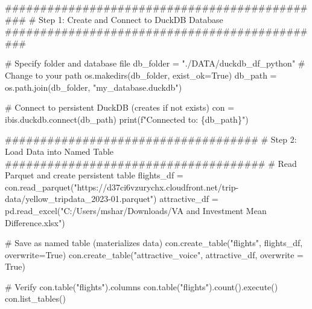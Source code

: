\documentclass[
  letterpaper,
  DIV=11,
  numbers=noendperiod]{scrreprt}
\newenvironment{Shaded}{\begin{snugshade}}{\end{snugshade}}
\newcommand{\BuiltInTok}[1]{\textcolor[rgb]{0.00,0.23,0.31}{#1}}
\newcommand{\CommentTok}[1]{\textcolor[rgb]{0.37,0.37,0.37}{#1}}
\newcommand{\ExtensionTok}[1]{\textcolor[rgb]{0.00,0.23,0.31}{#1}}
\newcommand{\NormalTok}[1]{\textcolor[rgb]{0.00,0.23,0.31}{#1}}
\newcommand{\OperatorTok}[1]{\textcolor[rgb]{0.37,0.37,0.37}{#1}}
\newcommand{\SpecialCharTok}[1]{\textcolor[rgb]{0.37,0.37,0.37}{#1}}
\newcommand{\SpecialStringTok}[1]{\textcolor[rgb]{0.13,0.47,0.30}{#1}}
\newcommand{\StringTok}[1]{\textcolor[rgb]{0.13,0.47,0.30}{#1}}
\newcommand{\VariableTok}[1]{\textcolor[rgb]{0.07,0.07,0.07}{#1}}
\begin{document}
\begin{Shaded}
\begin{Highlighting}[]
\CommentTok{\#\#\#\#\#\#\#\#\#\#\#\#\#\#\#\#\#\#\#\#\#\#\#\#\#\#\#\#\#\#\#\#\#\#\#\#\#\#\#\#\#\#\#\#\#\#}
\CommentTok{\# Step 1: Create and Connect to DuckDB Database}
\CommentTok{\#\#\#\#\#\#\#\#\#\#\#\#\#\#\#\#\#\#\#\#\#\#\#\#\#\#\#\#\#\#\#\#\#\#\#\#\#\#\#\#\#\#\#\#\#\#}

\CommentTok{\# Specify folder and database file}
\NormalTok{db\_folder }\OperatorTok{=} \StringTok{"./DATA/duckdb\_df\_python"}  \CommentTok{\# Change to your path}
\NormalTok{os.makedirs(db\_folder, exist\_ok}\OperatorTok{=}\VariableTok{True}\NormalTok{)}
\NormalTok{db\_path }\OperatorTok{=}\NormalTok{ os.path.join(db\_folder, }\StringTok{"my\_database.duckdb"}\NormalTok{)}

\CommentTok{\# Connect to persistent DuckDB (creates if not exists)}
\NormalTok{con }\OperatorTok{=}\NormalTok{ ibis.duckdb.}\ExtensionTok{connect}\NormalTok{(db\_path)}
\BuiltInTok{print}\NormalTok{(}\SpecialStringTok{f"Connected to: }\SpecialCharTok{\{}\NormalTok{db\_path}\SpecialCharTok{\}}\SpecialStringTok{"}\NormalTok{)}
\end{Highlighting}
\end{Shaded}

\begin{Shaded}
\begin{Highlighting}[]
\CommentTok{\#\#\#\#\#\#\#\#\#\#\#\#\#\#\#\#\#\#\#\#\#\#\#\#\#\#\#\#\#\#\#\#\#\#\#\#}
\CommentTok{\# Step 2: Load Data into Named Table}
\CommentTok{\#\#\#\#\#\#\#\#\#\#\#\#\#\#\#\#\#\#\#\#\#\#\#\#\#\#\#\#\#\#\#\#\#\#\#\#\#}
\CommentTok{\# Read Parquet and create persistent table}
\NormalTok{flights\_df }\OperatorTok{=}\NormalTok{ con.read\_parquet(}\StringTok{"https://d37ci6vzurychx.cloudfront.net/trip{-}data/yellow\_tripdata\_2023{-}01.parquet"}\NormalTok{)}
\NormalTok{attractive\_df }\OperatorTok{=}\NormalTok{ pd.read\_excel(}\StringTok{"C:/Users/mshar/Downloads/VA and Investment Mean Difference.xlsx"}\NormalTok{)}

\CommentTok{\# Save as named table (materializes data)}
\NormalTok{con.create\_table(}\StringTok{"flights"}\NormalTok{, flights\_df, overwrite}\OperatorTok{=}\VariableTok{True}\NormalTok{)}
\NormalTok{con.create\_table(}\StringTok{"attractive\_voice"}\NormalTok{, attractive\_df, overwrite }\OperatorTok{=} \VariableTok{True}\NormalTok{)}

\CommentTok{\# Verify}
\NormalTok{con.table(}\StringTok{"flights"}\NormalTok{).columns }
\NormalTok{con.table(}\StringTok{"flights"}\NormalTok{).count().execute()}
\NormalTok{con.list\_tables()}
\end{Highlighting}
\end{Shaded}
\end{document}
